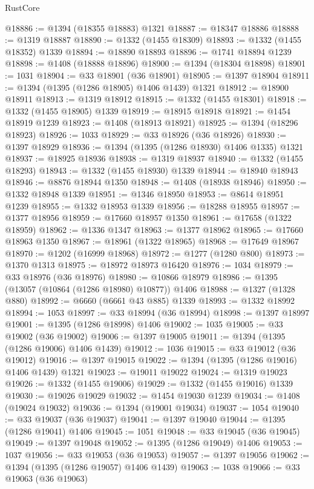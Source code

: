 \begin{lexlean}{RustCore}
\begin{coremodule}
@18886 := @1394 (@18355 @18883) @1321
@18887 := @18347 @18886
@18888 := @1319 @18887
@18890 := @1332 (@1455 @18309)
@18893 := @1332 (@1455 @18352) @1339
@18894 := @18890 @18893
@18896 := @1741 @18894 @1239
@18898 := @1408 (@18888 @18896)
@18900 := @1394 (@18304 @18898)
@18901 := 1031
@18904 := @33 @18901 (@36 @18901)
@18905 := @1397 @18904
@18911 := @1394 (@1395 (@1286 @18905) @1406 @1439) @1321
@18912 := @18900 @18911
@18913 := @1319 @18912
@18915 := @1332 (@1455 @18301)
@18918 := @1332 (@1455 @18905) @1339
@18919 := @18915 @18918
@18921 := @1454 @18919 @1239
@18923 := @1408 (@18913 @18921)
@18925 := @1394 (@18296 @18923)
@18926 := 1033
@18929 := @33 @18926 (@36 @18926)
@18930 := @1397 @18929
@18936 := @1394 (@1395 (@1286 @18930) @1406 @1335) @1321
@18937 := @18925 @18936
@18938 := @1319 @18937
@18940 := @1332 (@1455 @18293)
@18943 := @1332 (@1455 @18930) @1339
@18944 := @18940 @18943
@18946 := @8876 @18944 @1350
@18948 := @1408 (@18938 @18946)
@18950 := @1332 @18948 @1339
@18951 := @1346 @18950
@18953 := @8614 @18951 @1239
@18955 := @1332 @18953 @1339
@18956 := @18288 @18955
@18957 := @1377 @18956
@18959 := @17660 @18957 @1350
@18961 := @17658 (@1322 @18959)
@18962 := @1336 @1347
@18963 := @1377 @18962
@18965 := @17660 @18963 @1350
@18967 := @18961 (@1322 @18965)
@18968 := @17649 @18967
@18970 := @1202 (@16999 @18968)
@18972 := @1277 (@1280 @800)
@18973 := @1370 @1313
@18975 := @18972 @18973 @16420
@18976 := 1034
@18979 := @33 @18976 (@36 @18976)
@18980 := @10866 @18979
@18986 := @1395 (@13057 (@10864 (@1286 @18980) @10877)) @1406
@18988 := @1327 (@1328 @880)
@18992 := @6660 (@6661 @43 @885) @1339
@18993 := @1332 @18992
@18994 := 1053
@18997 := @33 @18994 (@36 @18994)
@18998 := @1397 @18997
@19001 := @1395 (@1286 @18998) @1406
@19002 := 1035
@19005 := @33 @19002 (@36 @19002)
@19006 := @1397 @19005
@19011 := @1394 (@1395 (@1286 @19006) @1406 @1439)
@19012 := 1036
@19015 := @33 @19012 (@36 @19012)
@19016 := @1397 @19015
@19022 := @1394 (@1395 (@1286 @19016) @1406 @1439) @1321
@19023 := @19011 @19022
@19024 := @1319 @19023
@19026 := @1332 (@1455 @19006)
@19029 := @1332 (@1455 @19016) @1339
@19030 := @19026 @19029
@19032 := @1454 @19030 @1239
@19034 := @1408 (@19024 @19032)
@19036 := @1394 (@19001 @19034)
@19037 := 1054
@19040 := @33 @19037 (@36 @19037)
@19041 := @1397 @19040
@19044 := @1395 (@1286 @19041) @1406
@19045 := 1051
@19048 := @33 @19045 (@36 @19045)
@19049 := @1397 @19048
@19052 := @1395 (@1286 @19049) @1406
@19053 := 1037
@19056 := @33 @19053 (@36 @19053)
@19057 := @1397 @19056
@19062 := @1394 (@1395 (@1286 @19057) @1406 @1439)
@19063 := 1038
@19066 := @33 @19063 (@36 @19063)

\end{coremodule}
\end{lexlean}
